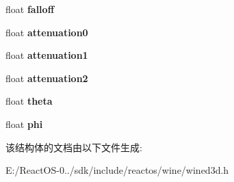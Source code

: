 \begin{DoxyCompactItemize}
float {\bfseries falloff}
\item 
\mbox{\label{structwined3d__light_aa36d27111b4915a2e3e8db0a42b7bf14}} 
float {\bfseries attenuation0}
\item 
\mbox{\label{structwined3d__light_a7ba66a58e77cae3a0c19b8eba6476c4c}} 
float {\bfseries attenuation1}
\item 
\mbox{\label{structwined3d__light_aa0bb07f21879a3268dd8f74fd9cc9d4d}} 
float {\bfseries attenuation2}
\item 
\mbox{\label{structwined3d__light_a78757f875903b9f0f59c1b767ab2bc0f}} 
float {\bfseries theta}
\item 
\mbox{\label{structwined3d__light_ad9e87755479fd6943ee919df1aa5570c}} 
float {\bfseries phi}
\end{DoxyCompactItemize}


该结构体的文档由以下文件生成\+:\begin{DoxyCompactItemize}
\item 
E\+:/\+React\+O\+S-\/0../sdk/include/reactos/wine/wined3d.\+h\end{DoxyCompactItemize}
